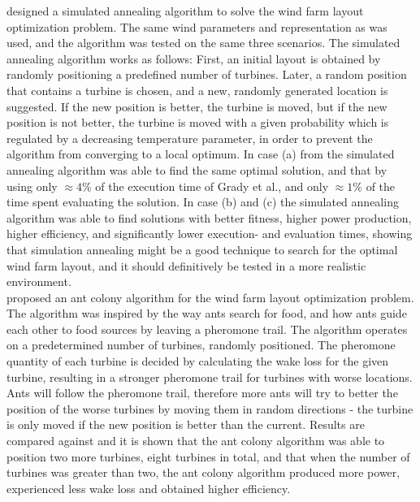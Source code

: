 \noindent \cite{Bilbao} designed a simulated annealing algorithm to solve the wind farm layout optimization problem. The same wind parameters and representation as \cite{Grady} was used, and the algorithm was tested on the same three scenarios. The simulated annealing algorithm works as follows: First, an initial layout is obtained by randomly positioning a predefined number of turbines. Later, a random position that contains a turbine is chosen, and a new, randomly generated location is suggested. If the new position is better, the turbine is moved, but if the new position is not better, the turbine is moved with a given probability which is regulated by a decreasing temperature parameter, in order to prevent the algorithm from converging to a local optimum. In case (a) from \citep{Grady} the simulated annealing algorithm was able to find the same optimal solution, and that by using only $\approx 4\%$ of the execution time of Grady et al., and only $\approx 1\%$ of the time spent evaluating the solution. In case (b) and (c) the simulated annealing algorithm was able to find solutions with better fitness, higher power production, higher efficiency, and significantly lower execution- and evaluation times, showing that simulation annealing might be a good technique to search for the optimal wind farm layout, and it should definitively be tested in a more realistic environment. \\ 


\noindent \cite{Eroglu} proposed an ant colony algorithm for the wind farm layout optimization problem. The algorithm was inspired by the way ants search for food, and how ants guide each other to food sources by leaving a pheromone trail. The algorithm operates on a predetermined number of turbines, randomly positioned. The pheromone quantity of each turbine is decided by calculating the wake loss for the given turbine, resulting in a stronger pheromone trail for turbines with worse locations. Ants will follow the pheromone trail, therefore more ants will try to better the position of the worse turbines by moving them in random directions - the turbine is only moved if the new position is better than the current. Results are compared against \citep{Kusiak} and it is shown that the ant colony algorithm was able to position two more turbines, eight turbines in total, and that when the number of turbines was greater than two, the ant colony algorithm produced more power, experienced less wake loss and obtained higher efficiency.\\


